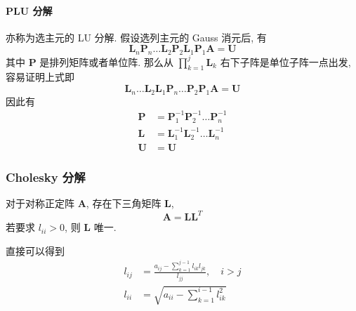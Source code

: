 \documentclass{ctexart}
\begin{document}
\paragraph{PLU 分解}
    亦称为选主元的 LU 分解.
    假设选列主元的 Gauss 消元后, 有 \[
        \mathbf{L}_n \mathbf{P}_n \ldots \mathbf{L}_2 \mathbf{P}_2 \mathbf{L}_1 \mathbf{P}_1 \mathbf{A} = \mathbf{U}\]
    其中 $\mathbf{P}$ 是排列矩阵或者单位阵. 那么从 $\prod_{k=1}^j \mathbf{L}_k$ 右下子阵是单位子阵一点出发, 容易证明上式即 \[
        \mathbf{L}_n  \ldots \mathbf{L}_2 \mathbf{L}_1 \mathbf{P}_n \ldots \mathbf{P}_2 \mathbf{P}_1 \mathbf{A} = \mathbf{U}\]
    因此有 \begin{align*}
        \mathbf{P} &= \mathbf{P}_1^{-1} \mathbf{P}_2^{-1} \ldots \mathbf{P}_n^{-1}\\
        \mathbf{L} &= \mathbf{L}_1^{-1} \mathbf{L}_2^{-1} \ldots \mathbf{L}_n^{-1}\\
        \mathbf{U} &= \mathbf{U}
    \end{align*}
\subsubsection{Cholesky 分解}
    对于对称正定阵 $\mathbf{A}$, 存在下三角矩阵 $\mathbf{L}$, \[
        \mathbf{A} = \mathbf{L} \mathbf{L}^T\]
    若要求 $l_{ii} > 0$, 则 $\mathbf{L}$ 唯一.\par
    直接可以得到 \begin{align*}
        l_{ij} &= \frac{a_{ij} - \sum_{k=1}^{j-1} l_{ik} l_{jk}}{l_{jj}},\quad i > j\\
        l_{ii} &= \sqrt{a_{ii} - \sum_{k=1}^{i-1} l_{ik}^2}
    \end{align*}
\end{document}
